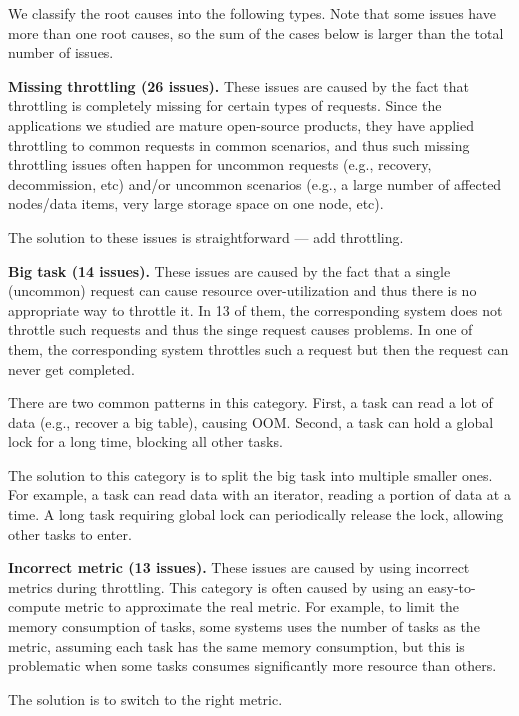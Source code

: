 We classify the root causes into the following types. Note that some issues have more than
one root causes, so the sum of the cases below is larger than the total number of issues.

\vspace{.05in}
\noindent
\textbf{Missing throttling (26 issues).} These issues are caused by the fact that throttling
is completely missing for certain types of requests. Since the applications we studied are mature
open-source products, they have applied throttling to common requests in common scenarios, and thus
such missing throttling issues often happen for uncommon requests (e.g., recovery, decommission, etc)
and/or uncommon scenarios (e.g., a large number of affected nodes/data items, very large storage space on one node, etc).

The solution to these issues is straightforward --- add throttling.

\vspace{.05in}
\noindent
\textbf{Big task (14 issues).} These issues are caused by the fact that a single (uncommon) request
can cause resource over-utilization and thus there is no appropriate way to throttle it. In 13 of them,
the corresponding system does not throttle such requests and thus the singe request causes problems. In one
of them, the corresponding system throttles such a request but then the request can never get completed.

There are two common patterns in this category. First, a task can read a lot of data (e.g., recover a big
table), causing OOM. Second, a task can hold a global lock for a long time, blocking all other tasks.

The solution to this category is to split the big task into multiple smaller ones. For example, a task can
read data with an iterator, reading a portion of data at a time. A long task requiring global lock can
periodically release the lock, allowing other tasks to enter.

\vspace{.05in}
\noindent
\textbf{Incorrect metric (13 issues).} These issues are caused by using incorrect metrics during
throttling. This category is often caused by using an easy-to-compute metric to approximate
the real metric. For example, to limit the memory consumption of tasks, some systems
uses the number of tasks as the metric, assuming each task has the same memory
consumption, but this is problematic when some tasks consumes significantly more resource
than others.

The solution is to switch to the right metric.

